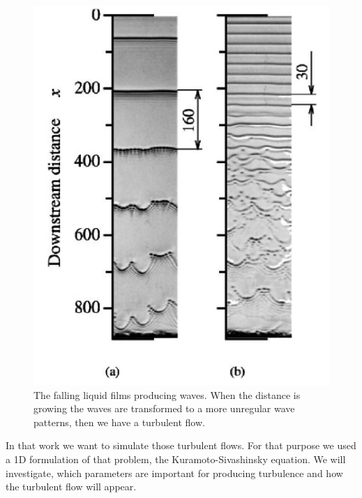 \documentclass[10pt,fleqn, %
reqno,a4paper]{article}
\begin{document}
\begin{figure}[htp!]
        \begin{center}
                \includegraphics[scale=0.7]{downstream-23-degree.png}
        \end{center}
\caption{The falling liquid films producing waves. When the distance is growing the waves are transformed to a more unregular wave patterns, then we have a turbulent flow. \cite{miyara_numerical_2000}}
        \label{pic:downstream}
\end{figure}

In that work we want to simulate those turbulent flows. For that purpose we used a 1D formulation of that problem, the Kuramoto-Sivashinsky equation. We will investigate, which parameters are important for producing turbulence and how the turbulent flow will appear. 

\newpage
\end{document}
